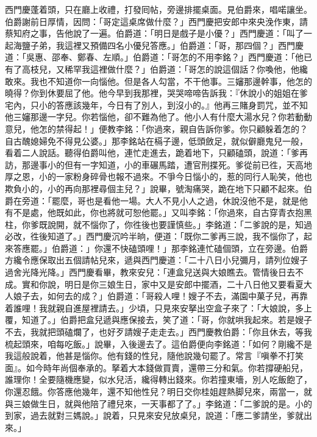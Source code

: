 西門慶蓬着頭，只在廳上收禮，打發囘帖，旁邊排擺桌面。見伯爵來，唱喏讓坐。伯爵謝前日厚情，因問：「哥定這桌席做什麼？」西門慶把安郎中來央浼作東，請蔡知府之事，告他說了一遍。伯爵道：「明日是戲子是小優？」西門慶道：「叫了一起海鹽子弟，我這裡又預備四名小優兒答應。」伯爵道：「哥，那四個？」{}西門慶道：「吳惠、邵奉、鄭春、左順。」伯爵道：「哥怎的不用李銘？」西門慶道：「他已有了高枝兒，又稀罕我這裡做什麼？」伯爵道：「哥怎的說這個話？你喚他，他纔敢來。我也不知道你一向惱他。但是各人勾當，不干他事。三嬸那邊幹事，他怎的曉得？你到休要屈了他。他今早到我那裡，哭哭啼啼告訴我：『休說小的姐姐在爹宅內，只小的答應該幾年，今日有了別人，到沒小的。』他再三賭身罰咒，並不知他三嬸那邊一字兒。你若惱他，卻不難為他了。他小人有什麼大湯水兒？你若動動意兒，他怎的禁得起！」便教李銘：「你過來，親自告訴你爹。你只顧躲着怎的？自古醜媳婦免不得見公婆。」那李銘站在槅子邊，低頭斂足，就似僻廳鬼兒一般，看着二人說話。聽得伯爵叫他，連忙走進去，跪着地下，只顧磕頭，說道：「爹再訪，那邊事小的但有一字知道，小的車碾馬踏，遭官刑揲死。爹從前已徃，天高地厚之恩，小的一家粉身碎骨也報不過來。不爭今日惱小的，惹的同行人恥笑，他也欺負小的，小的再向那裡尋個主兒？」說畢，號淘痛哭，跪在地下只顧不起來。伯爵在旁道：「罷麼，哥也是看他一場。大人不見小人之過，休說沒他不是，就是他有不是處，他既如此，你也將就可恕他罷。」又叫李銘：「你過來，自古穿青衣抱黑柱，你爹既說開，就不惱你了，你徃後也要謹慎些。」李銘道：「二爹說的是，知過必改，徃後知道了。」西門慶沉吟半晌，便道：「既你二爹再三說，我不惱你了，起來答應罷。」伯爵道：」你還不快磕頭哩！」那李銘連忙磕個頭，立在旁邊。伯爵方纔令應保取出五個請帖兒來，遞與西門慶道：「二十八日小兒彌月，請列位嫂子過舍光降光降。」西門慶看畢，教來安兒：「連盒兒送與大娘瞧去。管情後日去不成。實和你說，明日是你三娘生日，家中又是安郎中擺酒，二十八日他又要看夏大人娘子去，如何去的成？」伯爵道：「哥殺人哩！嫂子不去，滿園中菓子兒，再靠着誰哩！我就親自進屋裡請去。」{}少頃，只見來安拏出空盒子來了：「大娘說，多上覆，知道了。」伯爵把盒兒遞與應保接去，笑了道：「哥，你就哄我起來。若是嫂子不去，我就把頭磕爛了，也好歹請嫂子走走去。」西門慶教伯爵：「你且休去，等我梳起頭來，咱每吃飯。」說畢，入後邊去了。這伯爵便向李銘道：「如何？剛纔不是我這般說着，他甚是惱你。他有錢的性兒，隨他說幾句罷了。常言『嗔拳不打笑面』。如今時年尚個奉承的。拏着大本錢做買賣，還帶三分和氣。你若撐硬船兒，誰理你！全要隨機應變，似水兒活，纔得轉出錢來。你若撞東墻，別人吃飯飽了，你還忍餓。{}你答應他幾年，還不知他性兒？明日交你桂姐趕熱脚兒來，兩當一，就與三娘做生日，就與他陪了禮兒來，一天事都了了。」李銘道：「二爹說的是。小的到家，過去就對三媽說。」說着，只見來安兒放桌兒，說道：「應二爹請坐，爹就出來。」

